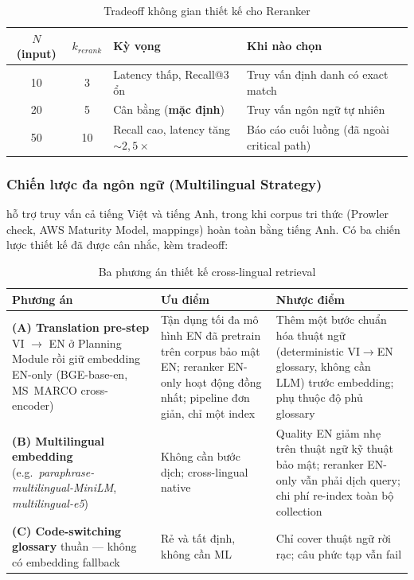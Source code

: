 \begin{table}[!htb]
  \centering
  \caption{Tradeoff không gian thiết kế cho Reranker}
  \label{tab:rerank_tradeoff}
  \footnotesize
  \begin{tabular}{|c|c|p{4.0cm}|p{4.5cm}|}
    \hline
    \textbf{$N$ (input)} & \textbf{$k_{rerank}$} & \textbf{Kỳ vọng} & \textbf{Khi nào chọn} \\ \hline
    10 & 3 & Latency thấp, Recall@3 ổn & Truy vấn định danh có exact match \\ \hline
    20 & 5 & Cân bằng (\textbf{mặc định}) & Truy vấn ngôn ngữ tự nhiên \\ \hline
    50 & 10 & Recall cao, latency tăng $\sim 2{,}5\times$ & Báo cáo cuối luồng (đã ngoài critical path) \\ \hline
  \end{tabular}
\end{table}

\subsubsection*{Chiến lược đa ngôn ngữ (Multilingual Strategy)}
\label{subsubsec:multilingual_strategy}

\sysnameshort{} hỗ trợ truy vấn cả tiếng Việt và tiếng Anh, trong khi corpus tri thức (Prowler check, AWS Maturity Model, mappings) hoàn toàn bằng tiếng Anh. Có ba chiến lược thiết kế đã được cân nhắc, kèm tradeoff:

\begin{table}[!htb]
  \centering
  \caption{Ba phương án thiết kế cross-lingual retrieval}
  \label{tab:multilingual_options}
  \footnotesize
  \renewcommand{\arraystretch}{1.2}
  \begin{tabular}{|p{2.2cm}|p{4.6cm}|p{4.5cm}|}
    \hline
    \textbf{Phương án} & \textbf{Ưu điểm} & \textbf{Nhược điểm} \\ \hline
    \textbf{(A) Translation pre-step} VI $\rightarrow$ EN ở Planning Module rồi giữ embedding EN-only (BGE-base-en, MS~MARCO cross-encoder) & Tận dụng tối đa mô hình EN đã pretrain trên corpus bảo mật EN; reranker EN-only hoạt động đồng nhất; pipeline đơn giản, chỉ một index & Thêm một bước chuẩn hóa thuật ngữ (deterministic VI$\rightarrow$EN glossary, không cần LLM) trước embedding; phụ thuộc độ phủ glossary \\ \hline
    \textbf{(B) Multilingual embedding} (e.g.\ \textit{paraphrase-multilingual-MiniLM}, \textit{multilingual-e5}) & Không cần bước dịch; cross-lingual native & Quality EN giảm nhẹ trên thuật ngữ kỹ thuật bảo mật; reranker EN-only vẫn phải dịch query; chi phí re-index toàn bộ collection \\ \hline
    \textbf{(C) Code-switching glossary} thuần — không có embedding fallback & Rẻ và tất định, không cần ML & Chỉ cover thuật ngữ rời rạc; câu phức tạp vẫn fail \\ \hline
  \end{tabular}
\end{table}

